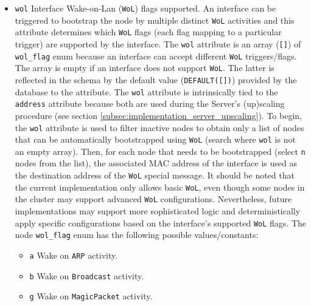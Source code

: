 \begin{itemize}
  \item \texttt{wol}
    \newline
    Interface Wake-on-Lan (\texttt{WoL}) flags supported.
    \newline
    An interface can be triggered to bootstrap the node by multiple distinct
    \texttt{WoL} activities and this attribute determines which \texttt{WoL}
    flags (each flag mapping to a particular trigger) are supported by the
    interface.
    \newline
    The \texttt{wol} attribute is an array (\texttt{[]}) of \texttt{wol\_flag} enum
    because an interface can accept different \texttt{WoL} triggers/flags. The array
    is empty if an interface does not support \texttt{WoL}. The latter is reflected
    in the schema by the default value (\texttt{DEFAULT([])}) provided by the
    database to the attribute.
    \newline
    The \texttt{wol} attribute is intrinsically tied to the \texttt{address} attribute
    because both are used during the Server's (up)scaling procedure (see section
    \ref{subsec:implementation_server_upscaling}). To begin, the \texttt{wol} attribute
    is used to filter inactive nodes to obtain only a list of nodes that can be automatically
    bootstrapped using \texttt{WoL} (search where \texttt{wol} is not an empty
    array). Then, for each node that needs to be bootstrapped (select \texttt{n}
    nodes from the list), the associated MAC address of the interface is used as
    the destination address of the \texttt{WoL} special message. It should be noted
    that the current implementation only allows basic \texttt{WoL}, even though some
    nodes in the cluster may support advanced \texttt{WoL} configurations. Nevertheless,
    future implementations may support more sophisticated logic and
    deterministically apply specific configurations based on the interface's
    supported \texttt{WoL} flags.
    \newline
    The node \texttt{wol\_flag} enum has the following possible values/constants:
    \begin{itemize}
      \item \texttt{a}
        \newline
        Wake on \texttt{ARP} activity.

      \item \texttt{b}
        \newline
        Wake on \texttt{Broadcast} activity.

      \item \texttt{g}
        \newline
        Wake on \texttt{MagicPacket} activity.


\end{itemize}
\end{itemize}
